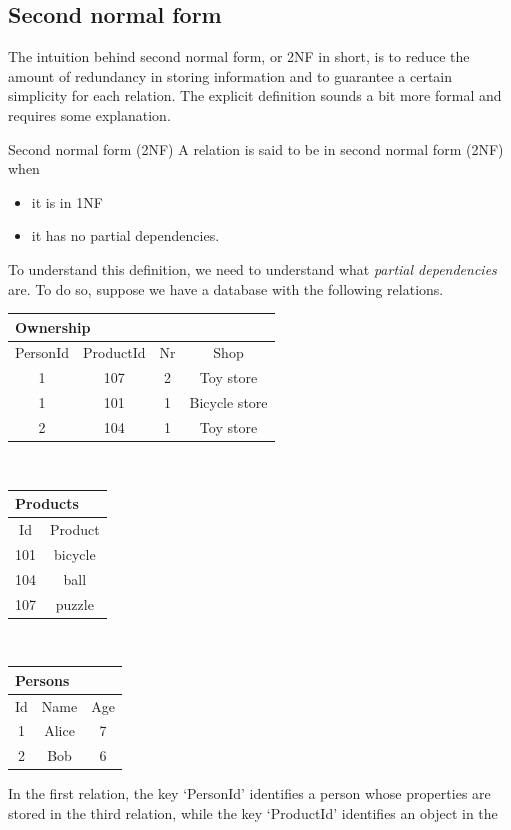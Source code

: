 \subsection{Second normal form}
The intuition behind second normal form, or 2NF in short, is to reduce the
amount of redundancy in storing information and to guarantee a certain
simplicity for each relation. The explicit definition sounds a bit more formal and
requires some explanation.
\begin{terminology}{Second normal form (2NF)}
A relation is said to be in second normal form (2NF) when 
\begin{itemize}
\item it is in 1NF
\item it has no partial dependencies.
\end{itemize}
\end{terminology}
To understand this definition, we need to understand what \emph{partial
dependencies} are. To do so, suppose we have a database with the following
relations.
\begin{center}
\begin{tabular}{|cccc|}
\multicolumn{4}{l}{Ownership}\\
\hline
PersonId & ProductId  & Nr & Shop           \\
\hline
1  &   107   &2  & Toy store \\
1  &   101   &1  & Bicycle store\\
2  &   104   &1  & Toy store\\
\hline
\end{tabular}
$\:\:$\begin{tabular}{|cc|}
\multicolumn{2}{l}{Products}\\
\hline
Id  & Product \\ 
\hline
101 & bicycle\\
104 & ball   \\
107 & puzzle \\
\hline
\end{tabular}$\:\:$\begin{tabular}{|ccc|}
\multicolumn{2}{l}{Persons}\\
\hline
Id  & Name & Age \\ 
\hline
1 & Alice & 7\\
2 & Bob   & 6\\
\hline
\end{tabular}
\end{center}
In the first relation, the key `PersonId' identifies a person whose properties are
stored in the third relation, while the key `ProductId' identifies an object in the

